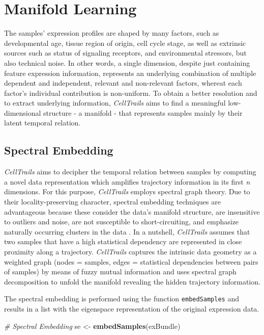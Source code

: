 \documentclass[]{book}
\newenvironment{Shaded}{\begin{snugshade}}{\end{snugshade}}
\newcommand{\KeywordTok}[1]{\textcolor[rgb]{0.13,0.29,0.53}{\textbf{#1}}}
\newcommand{\StringTok}[1]{\textcolor[rgb]{0.31,0.60,0.02}{#1}}
\newcommand{\CommentTok}[1]{\textcolor[rgb]{0.56,0.35,0.01}{\textit{#1}}}
\newcommand{\NormalTok}[1]{#1}
\theoremstyle{definition}
\theoremstyle{definition}
\theoremstyle{definition}
\theoremstyle{remark}
\begin{document}
\chapter{Manifold Learning}\label{manifold-learning}

The samples' expression profiles are shaped by many factors, such as
developmental age, tissue region of origin, cell cycle stage, as well as
extrinsic sources such as status of signaling receptors, and
environmental stressors, but also technical noise. In other words, a
single dimension, despite just containing feature expression
information, represents an underlying combination of multiple dependent
and independent, relevant and non-relevant factors, whereat each
factor's individual contribution is non-uniform. To obtain a better
resolution and to extract underlying information, \emph{CellTrails} aims
to find a meaningful low-dimensional structure - a manifold - that
represents samples mainly by their latent temporal relation.

\section{Spectral Embedding}\label{spectral-embedding}

\emph{CellTrails} aims to decipher the temporal relation between samples
by computing a novel data representation which amplifies trajectory
information in its first \emph{n} dimensions. For this purpose,
\emph{CellTrails} employs spectral graph theory. Due to their
locality-preserving character, spectral embedding techniques are
advantageous because these consider the data's manifold structure, are
insensitive to outliers and noise, are not susceptible to
short-circuiting, and emphasize naturally occurring clusters in the data
\citep{belkin2003, sussman2012}. In a nutshell, \emph{CellTrails}
assumes that two samples that have a high statistical dependency are
represented in close proximity along a trajectory. \emph{CellTrails}
captures the intrinsic data geometry as a weighted graph (nodes =
samples, edges = statistical dependencies between pairs of samples) by
means of fuzzy mutual information and uses spectral graph decomposition
to unfold the manifold revealing the hidden trajectory information.

The spectral embedding is performed using the function
\texttt{embedSamples} and results in a list with the eigenspace
representation of the original expression data.

\begin{Shaded}
\begin{Highlighting}[]
\CommentTok{# Spectral Embedding}
\NormalTok{se <-}\StringTok{ }\KeywordTok{embedSamples}\NormalTok{(exBundle)}
\end{Highlighting}
\end{Shaded}
\end{document}
